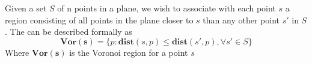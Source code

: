\documentclass{article}
\begin{document}
\newtheorem{theorem}{Theorem}[section]
\newtheorem{defn}{Definition}[section]

Given a set $S$ of n points in a plane, we wish to associate with each point $s$ a region consisting of all points in the plane closer to $s$
than any other point $s'$ in $S$. The can be described formally as
\[ 
    \mathbf{Vor}(\mathbf{s}) = \{p: \textbf{dist}(s, p) \leq \textbf{dist}(s', p), \forall s' \in S \}
\]
Where $\mathbf{Vor}(\mathbf{s})$ is the Voronoi region for a point $s$
\end{document}
